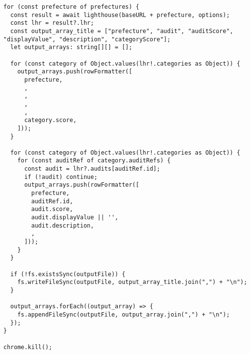 \begin{lstlisting}[caption={Lighthouseを用いたパフォーマンスの計測},label={lst:Lighthouseを用いたパフォーマンスの計測}]
for (const prefecture of prefectures) {
  const result = await lighthouse(baseURL + prefecture, options);
  const lhr = result?.lhr;
  const output_array_title = ["prefecture", "audit", "auditScore", "displayValue", "description", "categoryScore"];
  let output_arrays: string[][] = [];

  for (const category of Object.values(lhr!.categories as Object)) {
    output_arrays.push(rowFormatter([
      prefecture,
      ,
      ,
      ,
      ,
      category.score,
    ]));
  }

  for (const category of Object.values(lhr!.categories as Object)) {
    for (const auditRef of category.auditRefs) {
      const audit = lhr?.audits[auditRef.id];
      if (!audit) continue;
      output_arrays.push(rowFormatter([
        prefecture,
        auditRef.id,
        audit.score,
        audit.displayValue || '',
        audit.description,
        ,
      ]));
    }
  }

  if (!fs.existsSync(outputFile)) {
    fs.writeFileSync(outputFile, output_array_title.join(",") + "\n");
  }

  output_arrays.forEach((output_array) => {
    fs.appendFileSync(outputFile, output_array.join(",") + "\n");
  });
}

chrome.kill();
\end{lstlisting}

